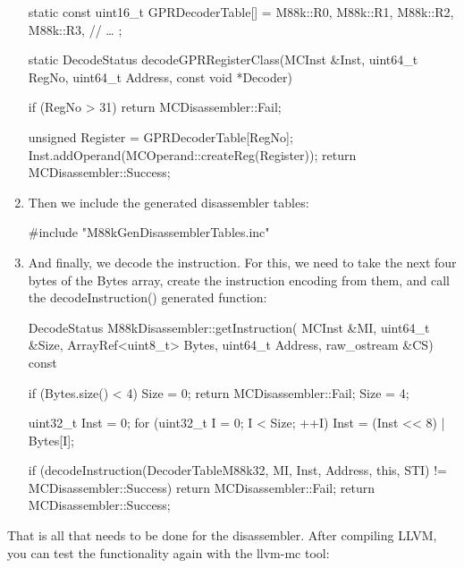 \begin{enumerate}
\begin{cpp}
static const uint16_t GPRDecoderTable[] = {
    M88k::R0, M88k::R1, M88k::R2, M88k::R3,
    // …
};

static DecodeStatus
decodeGPRRegisterClass(MCInst &Inst, uint64_t RegNo,
                        uint64_t Address,
                        const void *Decoder) {
    if (RegNo > 31)
        return MCDisassembler::Fail;

    unsigned Register = GPRDecoderTable[RegNo];
    Inst.addOperand(MCOperand::createReg(Register));
    return MCDisassembler::Success;
}
\end{cpp}

\item
Then we include the generated disassembler tables:

\begin{cpp}
#include "M88kGenDisassemblerTables.inc"
\end{cpp}

\item
And finally, we decode the instruction. For this, we need to take the next four bytes of the Bytes array, create the instruction encoding from them, and call the decodeInstruction() generated function:

\begin{cpp}
DecodeStatus M88kDisassembler::getInstruction(
        MCInst &MI, uint64_t &Size, ArrayRef<uint8_t> Bytes,
        uint64_t Address, raw_ostream &CS) const {
    if (Bytes.size() < 4) {
        Size = 0;
        return MCDisassembler::Fail;
    }
    Size = 4;

    uint32_t Inst = 0;
    for (uint32_t I = 0; I < Size; ++I)
        Inst = (Inst << 8) | Bytes[I];

    if (decodeInstruction(DecoderTableM88k32, MI, Inst,
                          Address, this, STI) !=
        MCDisassembler::Success) {
        return MCDisassembler::Fail;
    }
    return MCDisassembler::Success;
}
\end{cpp}

\end{enumerate}

That is all that needs to be done for the disassembler. After compiling LLVM, you can test the functionality again with the llvm-mc tool:



